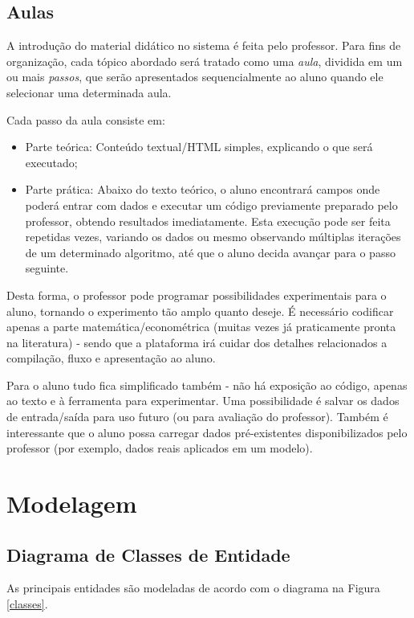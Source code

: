 \documentclass{abnt}
\begin{document}
\subsection{Aulas}
A introdução do material didático no sistema é feita pelo professor. Para fins de organização, cada tópico abordado será tratado como uma \textit{aula}, dividida em um ou mais \textit{passos}, que serão apresentados sequencialmente ao aluno quando ele selecionar uma determinada aula.

Cada passo da aula consiste em:
\begin{itemize}
\item Parte teórica: Conteúdo textual/HTML simples, explicando o que será executado; 
\item Parte prática: Abaixo do texto teórico, o aluno encontrará campos onde poderá entrar com dados e executar um código previamente preparado pelo professor, obtendo resultados imediatamente. Esta execução pode ser feita repetidas vezes, variando os dados ou mesmo observando múltiplas iterações de um determinado algoritmo, até que o aluno decida avançar para o passo seguinte.
\end{itemize}

Desta forma, o professor pode programar possibilidades experimentais para o aluno, tornando o experimento tão amplo quanto deseje. É necessário codificar apenas a parte matemática/econométrica (muitas vezes já praticamente pronta na literatura) - sendo que a plataforma irá cuidar dos detalhes relacionados a compilação, fluxo e apresentação ao aluno.

Para o aluno tudo fica simplificado também - não há exposição ao código, apenas ao texto e à ferramenta para experimentar. Uma possibilidade é salvar os dados de entrada/saída para uso futuro (ou para avaliação do professor). Também é interessante que o aluno possa carregar dados pré-existentes disponibilizados pelo professor (por exemplo, dados reais aplicados em um modelo).


\section {Modelagem}

\subsection{Diagrama de Classes de Entidade}
As principais entidades são modeladas de acordo com o diagrama na Figura \ref{classes}.
\end{document}
